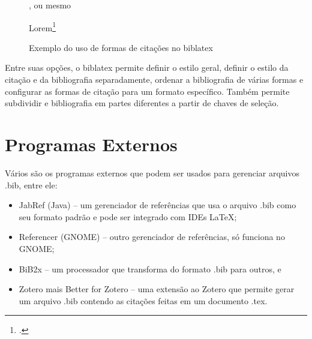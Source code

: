 \begin{figure}[hbt]
\centering
\begin{LTXexample}[pos=b]

\autocite{biber:2012}

\cite{biber:2012}

\parencite{biber:2012}, ou mesmo \parencite[veja][12]{biber:2012}

\textcite{biber:2012}

Lorem\footcite{biber:2012}

\end{LTXexample}
\caption{Exemplo do uso de formas de citações no biblatex}
\label{fig:cite}
\end{figure}

Entre suas opções, o biblatex permite definir o estilo geral, definir o estilo da citação e da bibliografia separadamente, ordenar a bibliografia de várias formas e configurar as formas de citação para um formato específico. Também permite subdividir e bibliografia em partes diferentes a partir de chaves de seleção\parencite{Cassidy:2013,Kime:2019}.

\section{Programas Externos}

Vários são os programas externos que podem ser usados
para gerenciar arquivos .bib, entre ele:

\begin{itemize}
    \item JabRef (Java) -- um gerenciador de referências que usa o arquivo .bib como seu formato padrão e pode ser integrado com IDEs \LaTeX;
    \item Referencer (GNOME) -- outro gerenciador de referências, só funciona no GNOME;
    \item BiB2x  -- um processador que transforma do formato .bib para outros, e
    \item Zotero mais Better  for Zotero -- uma extensão ao Zotero que permite gerar um arquivo .bib contendo as citações feitas em um documento .tex.
\end{itemize}


